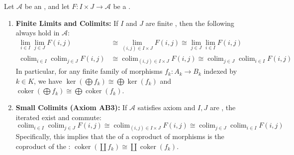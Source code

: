 \begin{proposition} \label{proposition:commutativity_of_limits_and_colimits_in_abelian_categories}
Let $\mathcal{A}$ be an , and let $F: I \times J \to \mathcal{A}$ be a .

\begin{enumerate}
    \item \textbf{Finite Limits and Colimits:} 
    If $I$ and $J$ are finite , then the following  always hold in $\mathcal{A}$:
    \begin{align}
        \lim_{i \in I} \lim_{j \in J} F(i, j) &\cong \lim_{(i, j) \in I \times J} F(i, j) \cong \lim_{j \in J} \lim_{i \in I} F(i, j) \\
        \operatorname{colim}_{i \in I} \operatorname{colim}_{j \in J} F(i, j) &\cong \operatorname{colim}_{(i, j) \in I \times J} F(i, j) \cong \operatorname{colim}_{j \in J} \operatorname{colim}_{i \in I} F(i, j)
    \end{align}
    In particular, for any finite family of morphisms $f_k: A_k \to B_k$ indexed by $k \in K$, we have $\ker(\bigoplus f_k) \cong \bigoplus \ker(f_k)$ and $\operatorname{coker}(\bigoplus f_k) \cong \bigoplus \operatorname{coker}(f_k)$.

    \item \textbf{Small Colimits (Axiom AB3):} 
    If $\mathcal{A}$ satisfies axiom  and $I, J$ are , the iterated  exist and commute:
    \begin{equation}
        \operatorname{colim}_{i \in I} \operatorname{colim}_{j \in J} F(i, j) \cong \operatorname{colim}_{(i, j) \in I \times J} F(i, j) \cong \operatorname{colim}_{j \in J} \operatorname{colim}_{i \in I} F(i, j)
    \end{equation}
    Specifically, this implies that the  of a  coproduct of morphisms is the coproduct of the : $\operatorname{coker}(\coprod f_k) \cong \coprod \operatorname{coker}(f_k)$.


\end{enumerate}
\end{proposition}

